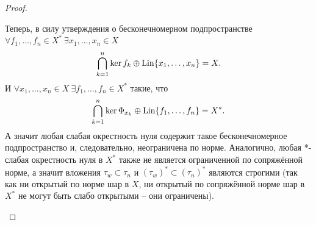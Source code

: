 \begin{proof}
\begin{enumerate}
        Теперь, в силу утверждения о бесконечномерном подпространстве $\forall f_1, \ldots, f_n \in X^* \ \exists x_1, \ldots, x_n \in X$
        \[
            \bigcap_{k = 1}^{n} \ker f_k \oplus \operatorname{Lin}\{x_1, \ldots, x_n\} = X.
        \]
        И $\forall x_1, \ldots, x_n \in X \ \exists f_1, \ldots, f_n \in X^*$ такие, что
        \[
            \bigcap_{k = 1}^{n} \ker \Phi_{x_k} \oplus \operatorname{Lin}\{f_1, \ldots, f_n\} = X^*.
        \]
        А значит любая слабая окрестность нуля содержит такое бесконечномерное подпространство и, следовательно, неограничена по норме.
        Аналогично, любая *-слабая окрестность нуля в $X^*$ также не является ограниченной по сопряжённой норме, а значит вложения $\tau_w \subset \tau_n$ и $(\tau_{w})^* \subset (\tau_{n})^*$ являются строгими (так как ни открытый по норме шар в $X$, ни открытый по сопряжённой норме шар в $X^*$ не могут быть слабо открытыми -- они ограничены).


\end{enumerate}
\end{proof}
